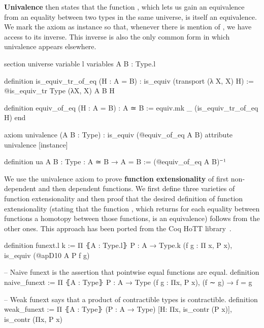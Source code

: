 \textbf{Univalence} then states that the function , which lets
us gain an equivalence from an equality between two types in the same universe,
is itself an equivalence.
We mark the axiom as instance so that, whenever there is mention of ,
we have access to its inverse.
This inverse  is also the only common form in which univalence appears
elsewhere.
\begin{leancodebr}
section
  universe variable l
  variables {A B : Type.{l}}

  definition is_equiv_tr_of_eq (H : A = B) :
    is_equiv (transport (λ X, X) H) :=
  @is_equiv_tr Type (λX, X) A B H

  definition equiv_of_eq (H : A = B) : A ≃ B :=
  equiv.mk _ (is_equiv_tr_of_eq H)
end

axiom univalence (A B : Type) : is_equiv (@equiv_of_eq A B)
attribute univalence [instance]

definition ua {A B : Type} : A ≃ B → A = B := (@equiv_of_eq A B)⁻¹
\end{leancodebr}

We use the univalence axiom to prove \textbf{function extensionality} of first
non-dependent and then dependent functions.
We first define three varieties of function extensionality and then proof that
the desired definition of function extensionality (stating that the function
, which returns for each equality between functions a homotopy
between those functions, is an equivalence) follows from the other ones.
This approach has been ported from the Coq HoTT library~\cite{hott-coq}.
\begin{leancode}
definition funext.{l k} := 
Π ⦃A : Type.{l}⦄ {P : A → Type.{k}} (f g : Π x, P x),
  is_equiv (@apD10 A P f g)

-- Naive funext is the assertion that pointwise equal functions are equal.
definition naive_funext :=
Π ⦃A : Type⦄ {P : A → Type} (f g : Πx, P x), (f ∼ g) → f = g

-- Weak funext says that a product of contractible types is contractible.
definition weak_funext :=
Π ⦃A : Type⦄ (P : A → Type) [H: Πx, is_contr (P x)], is_contr (Πx, P x)
\end{leancode}

